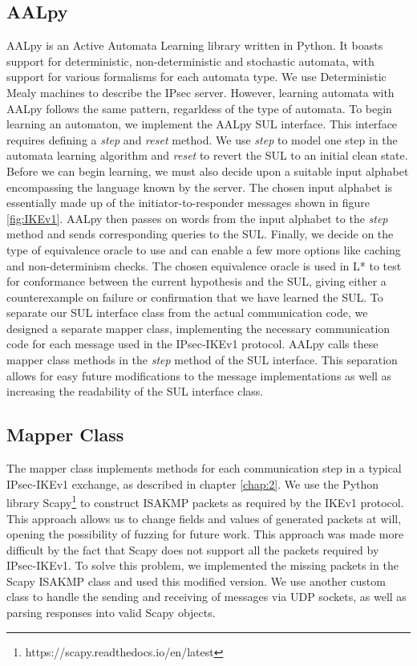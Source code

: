 \documentclass[runningheads]{llncs}
\begin{document}
\subsection{AALpy} %
AALpy is an Active Automata Learning library written in Python. It boasts support for deterministic, non-deterministic and stochastic automata, with support for various formalisms for each automata type. We use Deterministic Mealy machines to describe the IPsec server. However, learning automata with AALpy follows the same pattern, regarldess of the type of automata. To begin learning an automaton, we implement the AALpy SUL interface. This interface requires defining a \emph{step} and \emph{reset} method. We use \emph{step} to model one step in the automata learning algorithm and \emph{reset} to revert the SUL to an initial clean state. Before we can begin learning, we must also decide upon a suitable input alphabet encompassing the language known by the server. The chosen input alphabet is essentially made up of the initiator-to-responder messages shown in figure \ref{fig:IKEv1}. AALpy then passes on words from the input alphabet to the \emph{step} method and sends corresponding queries to the SUL. Finally, we decide on the type of equivalence oracle to use and can enable a few more options like caching and non-determinism checks. The chosen equivalence oracle is used in L* to test for conformance between the current hypothesis and the SUL, giving either a counterexample on failure or confirmation that we have learned the SUL. 
To separate our SUL interface class from the actual communication code, we designed a separate mapper class, implementing the necessary communication code for each message used in the IPsec-IKEv1 protocol. AALpy calls these mapper class methods in the \emph{step} method of the SUL interface. This separation allows for easy future modifications to the message implementations as well as increasing the readability of the SUL interface class.


\subsection{Mapper Class} %
The mapper class implements methods for each communication step in a typical IPsec-IKEv1 exchange, as described in chapter \ref{chap:2}. We use the Python library Scapy\footnote{https://scapy.readthedocs.io/en/latest} to construct ISAKMP packets as required by the IKEv1 protocol. This approach allows us to change fields and values of generated packets at will, opening the possibility of fuzzing for future work. This approach was made more difficult by the fact that Scapy does not support all the packets required by IPsec-IKEv1. To solve this problem, we implemented the missing packets in the Scapy ISAKMP class and used this modified version. We use another custom class to handle the sending and receiving of messages via UDP sockets, as well as parsing responses into valid Scapy objects.
\end{document}
